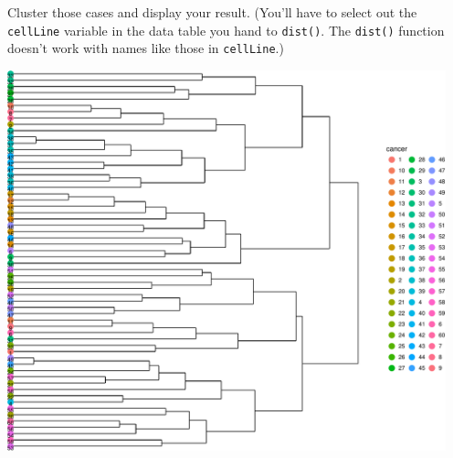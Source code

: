 \documentclass[]{tufte-handout}
\begin{document}
\enlargethispage{1.5in}

Cluster those cases and display your result. (You'll have to select out
the \texttt{cellLine} variable in the data table you hand to
\texttt{dist()}. The \texttt{dist()} function doesn't work with names
like those in \texttt{cellLine}.)

\includegraphics[width=5in]{863-UnsupervisedGenetics_files/figure-latex/unnamed-chunk-12-1}
\end{document}

